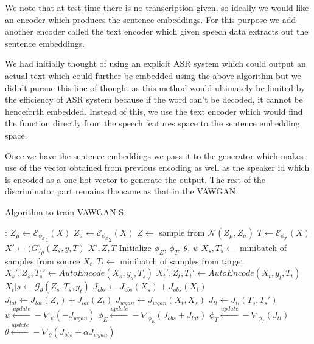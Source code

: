 \documentclass[letterpaper]{article}
\begin{document}
We note that at test time there is no transcription given, so ideally we would like an encoder which produces the sentence embeddings. For this purpose we add another encoder called the text encoder which given speech data extracts out the sentence embeddings. 

We had initially thought of using an explicit ASR system which could output an actual text which could further be embedded using the above algorithm but we didn't pursue this line of thought as this method would ultimately be limited by the efficiency of ASR system because if the word can't be decoded, it cannot be henceforth embedded. Instead of this, we use the text encoder which would find the function directly from the speech features space to the sentence embedding space.

Once we have the sentence embeddings we pass it to the generator which makes use of the vector obtained from previous encoding as well as the speaker id which is encoded as a one-hot vector to generate the output. The rest of the discriminator part remains the same as that in the VAWGAN. 
\begin{algorithm} %
\caption{Algorithm to train VAWGAN-S} %
\label{alg1} %
\begin{algorithmic} %
    :
    	\State $Z_{\mu} \leftarrow \mathcal{E_{\phi_{E}}}_1(X)$
        \State $Z_{\sigma} \leftarrow \mathcal{E_{\phi_{E}}}_2(X)$
        \State $Z \leftarrow $ sample from $\mathcal{N}(Z_\mu, Z_\sigma)$
        \State $T \leftarrow \mathcal{E_{\phi_T}}(X)$
        \State $X' \leftarrow \mathcal(G)_{\theta}(Z_s, y, T)$
        \State \Return $X', Z, T$
    \EndFunction
    \State Initialize $\phi_E$, $\phi_T$, $\theta$, $\psi$
	\State $X_s, T_s \leftarrow$ minibatch of samples from source
    \State $X_t, T_t \leftarrow$ minibatch of samples from target
    \State $X_s', Z_s, T_s' \leftarrow AutoEncode(X_s, y_s, T_s)$
    \State $X_t', Z_t, T_t' \leftarrow AutoEncode(X_t, y_t, T_t)$
    \State $X_t|s \leftarrow \mathcal{G_\theta}(Z_s, T_s, y_t)$
	\State $J_{obs} \leftarrow J_{obs}(X_s) + J_{obs}(X_t)$
    \State $J_{lat} \leftarrow J_{lat}(Z_s) + J_{lat}(Z_t)$
    \State $J_{wgan} \leftarrow J_{wgan}(X_t, X_s)$
    \State $J_{tl} \leftarrow J_{tl}(T_s,T_s')$
    \State $\psi \xleftarrow{update} - \nabla_{\psi}(-J_{wgan})$
    \State $\phi_E \xleftarrow{update} - \nabla_{\phi_E}(J_{obs} + J_{lat})$
    \State $\phi_T \xleftarrow{update} -\nabla_{\phi_T}(J_{tl})$
    \State $\theta \xleftarrow{update} -\nabla_{\theta}(J_{obs} + \alpha J_{wgan})$
    \EndWhile
    \EndWhile
\end{algorithmic}
\end{algorithm}
\end{document}
